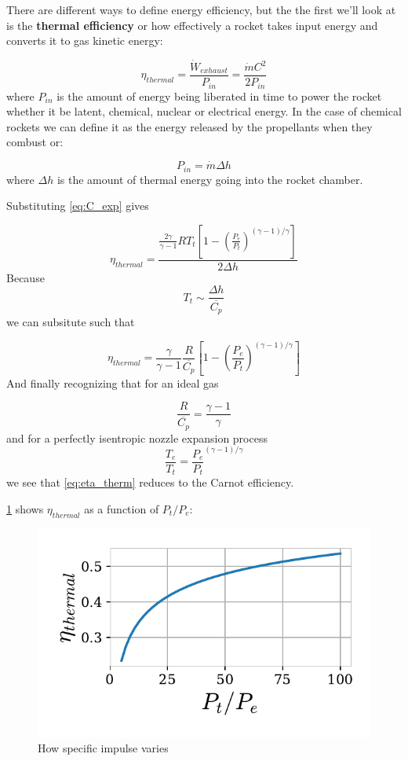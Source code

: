\documentclass[twocolumn]{memoir} %
\begin{document}
There are different ways to define energy efficiency, but the the first
we'll look at is the \textbf{thermal efficiency} or how effectively a
rocket takes input energy and converts it to gas kinetic energy:

\[\eta_{thermal} = \frac{\dot{W}_{exhaust}}{P_{in}} = \frac{\dot{m}C^2}{2P_{in}}\]
where \(P_{in}\) is the amount of energy being liberated in time to
power the rocket whether it be latent, chemical, nuclear or electrical energy. In
the case of chemical rockets we can define it as the energy released by
the propellants when they combust or:

\[P_{in} = \dot{m} \Delta h\]
%
where $\Delta h$ is the amount of thermal energy going into the rocket chamber.

Substituting \cref{eq:C_exp} gives

\begin{equation}
    \eta_{thermal} = \frac{\frac{2 \gamma}{\gamma-1}R T_t\left[1 - \left(\frac{P_e}{P_t}\right)^{(\gamma - 1)/\gamma}\right]}{2 \Delta h}
    \label{eq:eta_therm}
\end{equation}
%
Because
%
$$T_t \sim \frac{\Delta h}{\overline{C_p}}$$
%
we can subsitute such that

\begin{equation}
    \eta_{thermal} = \frac{\gamma}{\gamma-1}\frac{R}{\overline{C_p}}\left[1 - \left(\frac{P_e}{P_t}\right)^{(\gamma - 1)/\gamma}\right]
\end{equation}
%
And finally recognizing that for an ideal gas

$$\frac{R}{\overline{C_p}} = \frac{\gamma - 1}{\gamma}$$
%
and for a perfectly isentropic nozzle expansion process
%
$$\frac{T_e}{T_t} = \frac{P_e}{P_t}^{(\gamma - 1)/\gamma}$$
%
we see that \cref{eq:eta_therm} reduces to the Carnot efficiency.

\cref{fig:eta_therm} shows $\eta_{thermal}$ as a function of $P_t/P_e$:

\begin{figure}[h]
    \includegraphics[width=\columnwidth]{eta_therm}
    \caption{How specific impulse varies}
    \label{fig:eta_therm}
\end{figure}
\end{document}
